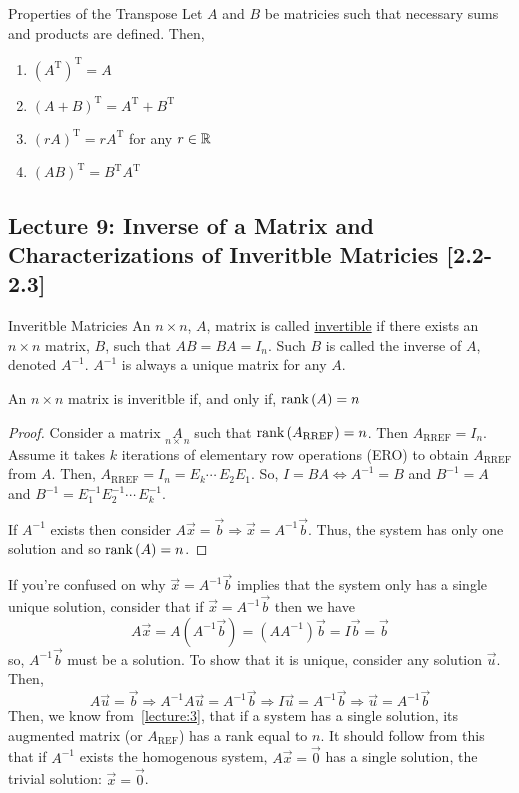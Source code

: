 \begin{thm}{Properties of the Transpose}{}
    Let $A$ and $B$ be matricies such that necessary sums and products are defined. Then, 
    \begin{enumerate}
        \item ${\left(A^{\text{T}}\right)}^{\text{T}} = A$
        \item ${\left(A+B\right)}^{\text{T}} = A^{\text{T}} + B^{\text{T}}$
        \item ${\left(rA\right)}^{\text{T}} = rA^{\text{T}}$ for any $r \in \mathbb R$
        \item ${\left(AB\right)}^{\text{T}} = B^{\text{T}}A^{\text{T}}$
    \end{enumerate}
\end{thm}

\subsection{Lecture 9: Inverse of a Matrix and Characterizations of Inveritble Matricies [2.2-2.3]}\label{lec:9}

\begin{defbox}{Inveritble Matricies}{}
    An $n \times n$, $A$, matrix is called \underline{invertible} if there exists an $n \times n$ matrix, $B$, such that $AB=BA=I_{n}$. Such $B$ is called the inverse of $A$, denoted $A^{-1}$. $A^{-1}$ is always a unique matrix for any $A$.
\end{defbox}

\begin{thm}{}{}
    An $n \times n$ matrix is inveritble if, and only if, $\text{rank}\left(A\right)=n$
    \begin{proof}
        Consider a matrix $\underset{n\times\,n}{A}$ such that $\text{rank}\left(A_\text{RREF}\right)=n$. Then $A_{\text{RREF}}=I_n$. Assume it takes $k$ iterations of elementary row operations (ERO) to obtain $A_{\text{RREF}}$ from $A$. Then, $A_{\text{RREF}}=I_n=E_k\cdots\,E_2E_1$. So, $I=BA \Leftrightarrow A^{-1}=B$ and $B^{-1}=A$ and $B^{-1}=E^{-1}_{1}E^{-1}_{2}\cdots\,E^{-1}_{k}$. 

        If $A^{-1}$ exists then consider $A\vec{x}=\vec{b} \Rightarrow \vec{x}=A^{-1}\vec{b}$. Thus, the system has only one solution and so $\text{rank}\left(A\right)=n$.
    \end{proof}
\end{thm}

If you're confused on why $\vec{x}=A^{-1}\vec{b}$ implies that the system only has a single unique solution, consider that if $\vec{x}=A^{-1}\vec{b}$ then we have 
\[
    A\vec{x} = A\left(A^{-1}\vec{b}\right) = \left(AA^{-1}\right)\vec{b} = I\vec{b} = \vec{b}
\]
so, $A^{-1}\vec{b}$ must be a solution. To show that it is unique, consider any solution $\vec{u}$. Then, 
\[
    A\vec{u} = \vec{b} \Rightarrow A^{-1}A\vec{u} = A^{-1}\vec{b} \Rightarrow I\vec{u} = A^{-1}\vec{b} \Rightarrow \vec{u} = A^{-1}\vec{b}
\]
Then, we know from~\ref{lecture:3}, that if a system has a single solution, its augmented matrix (or $A_{\text{REF}}$) has a rank equal to $n$. It should follow from this that if $A^{-1}$ exists the homogenous system, $A\vec{x}=\vec{0}$ has a single solution, the trivial solution: $\vec{x}=\vec{0}$.

